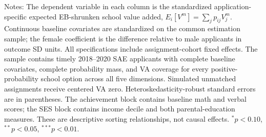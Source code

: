 \begin{table}[!htbp]
\centering
\caption{Baseline predictors of expected school value added}
\label{tab:expected-va-sorting}
\par\medskip
\footnotesize
\begin{minipage}{\textwidth}
Notes: The dependent variable in each column is the standardized application-specific expected EB-shrunken school value added, $E_i[V^m]=\sum_j p_{ij}V_j^m$. Continuous baseline covariates are standardized on the common estimation sample; the female coefficient is the difference relative to male applicants in outcome SD units. All specifications include assignment-cohort fixed effects. The sample contains timely 2018--2020 SAE applicants with complete baseline covariates, complete probability mass, and VA coverage for every positive-probability school option across all five dimensions. Simulated unmatched assignments receive centered VA zero. Heteroskedasticity-robust standard errors are in parentheses. The achievement block contains baseline math and verbal scores; the SES block contains income decile and both parental-education measures. These are descriptive sorting relationships, not causal effects. $^{*}p<0.10$, $^{**}p<0.05$, $^{***}p<0.01$.

\end{minipage}
\end{table}

